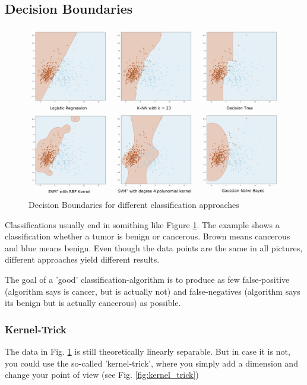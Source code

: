 \documentclass[11pt]{article}
\begin{document}
\subsection{Decision Boundaries}

\begin{figure}[htb!]
    \centering
    \includegraphics[keepaspectratio=true, width=\linewidth]{decision_boundaries.png}
    \caption{Decision Boundaries for different classification approaches}
    \label{fig:decision_boundaries}
\end{figure}

Classifications usually end in somithing like Figure \ref{fig:decision_boundaries}. The example shows a classification whether a tumor is benign or cancerous. Brown means cancerous and blue means benign. Even though the data points are the same in all pictures, different approaches yield different results.

The goal of a 'good' classification-algorithm is to produce as few false-positive (algorithm says is cancer, but is actually not) and false-negatives (algorithm says its benign but is actually cancerous) as possible.

\subsubsection{Kernel-Trick}
The data in Fig. \ref{fig:decision_boundaries} is still theoretically linearly separable. But in case it is not, you could use the so-called 'kernel-trick', where you simply add a dimension and change your point of view (see Fig. \ref{fig:kernel_trick})
\end{document}
